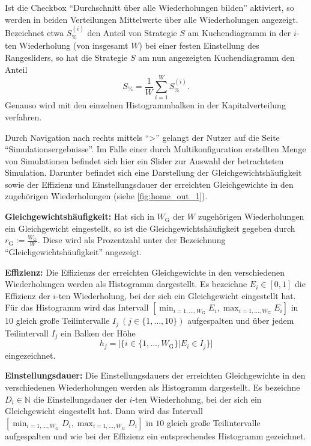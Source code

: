 \documentclass[parskip=full,11pt]{scrartcl}
\begin{document}
Ist die Checkbox \enquote{Durchschnitt über alle Wiederholungen bilden} aktiviert, so werden in beiden Verteilungen Mittelwerte über alle Wiederholungen angezeigt. Bezeichnet etwa \(S_\%^{(i)}\) den Anteil von Strategie \(S\) am Kuchendiagramm in der \(i\)-ten Wiederholung (von insgesamt \(W\)) bei einer festen Einstellung des Rangesliders, so hat die Strategie \(S\) am nun angezeigten Kuchendiagramm den Anteil
\[
S_\% = \frac 1W \sum_{i=1}^W S_\%^{(i)}.
\]
Genauso wird mit den einzelnen Histogrammbalken in der Kapitalverteilung verfahren.

Durch Navigation nach rechts mittels \enquote{>} gelangt der \Gls{Nutzer} auf die Seite \enquote{Simulationsergebnisse}. Im Falle einer durch Multikonfiguration erstellten Menge von Simulationen befindet sich hier ein Slider zur Auswahl der betrachteten Simulation. Darunter befindet sich eine Darstellung der Gleichgewichtshäufigkeit sowie der \Gls{Effizienz} und \Gls{Einstellungsdauer} der erreichten Gleichgewichte in den zugehörigen Wiederholungen (siehe \cref{fig:home_out_1}).

\textbf{Gleichgewichtshäufigkeit:}
Hat sich in \(W_\text{G}\) der \(W\) zugehörigen Wiederholungen ein Gleichgewicht eingestellt, so ist die Gleichgewichtshäufigkeit gegeben durch \(r_\text{G} := \frac{W_\text{G}}{W}\). Diese wird als Prozentzahl unter der Bezeichnung \enquote{Gleichgewichtshäufigkeit} angezeigt.

\textbf{\Gls{Effizienz}:}
Die \Glspl{Effizienz} der erreichten Gleichgewichte in den verschiedenen Wiederholungen werden als Histogramm dargestellt. Es bezeichne \(E_i \in [0,1]\) die \Gls{Effizienz} der \(i\)-ten Wiederholung, bei der sich ein Gleichgewicht eingestellt hat. Für das Histogramm wird das Intervall \([\min_{i = 1,...,W_\text{G}} E_i, \max_{i = 1,...,W_\text{G}} E_i]\) in \(10\) gleich große Teilintervalle \(I_j  \ (j \in \{1,...,10\})\) aufgespalten und über jedem Teilintervall \(I_j\) ein Balken der Höhe
\[
h_j = |\{i \in \{1,...,W_\text{G}\} | E_i \in I_j\}|
\]
eingezeichnet.

\textbf{\Gls{Einstellungsdauer}:}
Die \Glspl{Einstellungsdauer} der erreichten Gleichgewichte in den verschiedenen Wiederholungen werden als Histogramm dargestellt. Es bezeichne \(D_i \in \mathbb{N}\) die \Gls{Einstellungsdauer} der \(i\)-ten Wiederholung, bei der sich ein Gleichgewicht eingestellt hat. Dann wird das Intervall \([\min_{i = 1,...,W_\text{G}} D_i, \max_{i = 1,...,W_\text{G}} D_i]\) in \(10\) gleich große Teilintervalle aufgespalten und wie bei der \Gls{Effizienz} ein entsprechendes Histogramm gezeichnet. 
\end{document}
